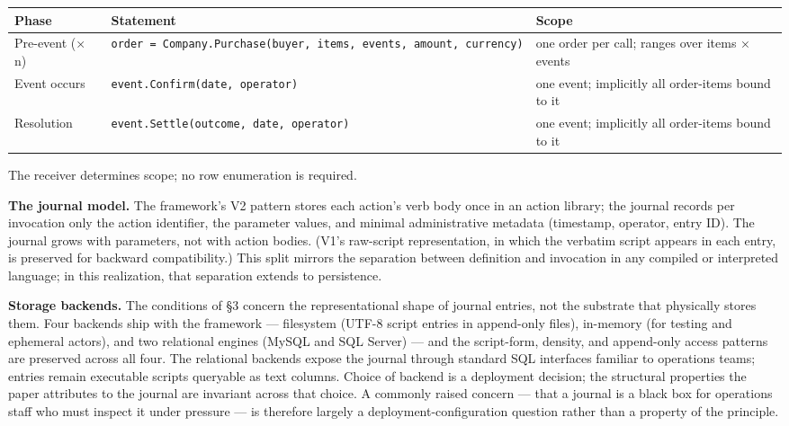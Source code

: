 \documentclass[
]{article}
\newcounter{none} %
\let\origtexttt\texttt%
\renewcommand{\texttt}[1]{\origtexttt{\seqsplit{#1}}}%
\let\texttt\origtexttt%
\begin{document}
{\def\LTcaptype{none} %
\begin{longtable}[]{@{}
  >{\raggedright\arraybackslash}p{}
  >{\raggedright\arraybackslash}p{}
  >{\raggedright\arraybackslash}p{}@{}}
\toprule\noalign{}
\begin{minipage}[b]{\linewidth}\raggedright
Phase
\end{minipage} & \begin{minipage}[b]{\linewidth}\raggedright
Statement
\end{minipage} & \begin{minipage}[b]{\linewidth}\raggedright
Scope
\end{minipage} \\
\midrule\noalign{}
\endhead
\bottomrule\noalign{}
\endlastfoot
Pre-event (× n) &
\texttt{order\ =\ Company.Purchase(buyer,\ items,\ events,\ amount,\ currency)}
& one order per call; ranges over items × events \\
Event occurs & \texttt{event.Confirm(date,\ operator)} & one event;
implicitly all order-items bound to it \\
Resolution & \texttt{event.Settle(outcome,\ date,\ operator)} & one
event; implicitly all order-items bound to it \\
\end{longtable}
}

The receiver determines scope; no row enumeration is required.

\textbf{The journal model.} The framework's V2 pattern stores each
action's verb body once in an action library; the journal records per
invocation only the action identifier, the parameter values, and minimal
administrative metadata (timestamp, operator, entry ID). The journal
grows with parameters, not with action bodies. (V1's raw-script
representation, in which the verbatim script appears in each entry, is
preserved for backward compatibility.) This split mirrors the separation
between definition and invocation in any compiled or interpreted
language; in this realization, that separation extends to persistence.

\textbf{Storage backends.} The conditions of §3 concern the
representational shape of journal entries, not the substrate that
physically stores them. Four backends ship with the framework ---
filesystem (UTF-8 script entries in append-only files), in-memory (for
testing and ephemeral actors), and two relational engines (MySQL and SQL
Server) --- and the script-form, density, and append-only access
patterns are preserved across all four. The relational backends expose
the journal through standard SQL interfaces familiar to operations
teams; entries remain executable scripts queryable as text columns.
Choice of backend is a deployment decision; the structural properties
the paper attributes to the journal are invariant across that choice. A
commonly raised concern --- that a journal is a black box for operations
staff who must inspect it under pressure --- is therefore largely a
deployment-configuration question rather than a property of the
principle.
\end{document}
